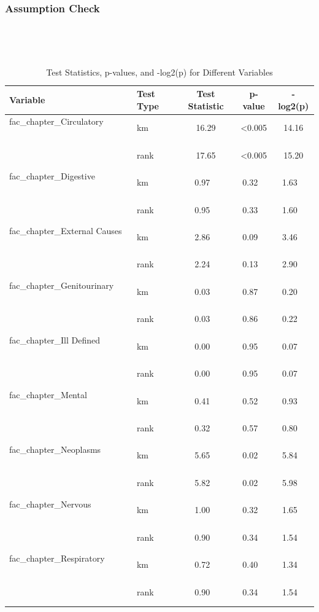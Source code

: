\subsubsection*{Assumption Check}
\begin{table}[H]
    \centering
    \caption{Test Statistics, p-values, and -log2(p) for Different Variables}
    \tiny
    \begin{tabular}{|l|l|c|c|c|}
\hline
\textbf{Variable}                & \textbf{Test Type} & \textbf{Test Statistic} & \textbf{p-value} & \textbf{-log2(p)} \\ \hline
 fac\_chapter\_Circulatory        & km   & 16.29 & <0.005 & 14.16 \\ \hline
                                    & rank & 17.65 & <0.005 & 15.20 \\ \hline
 fac\_chapter\_Digestive          & km   & 0.97  & 0.32   & 1.63  \\ \hline
                                    & rank & 0.95  & 0.33   & 1.60  \\ \hline
 fac\_chapter\_External Causes    & km   & 2.86  & 0.09   & 3.46  \\ \hline
                                    & rank & 2.24  & 0.13   & 2.90  \\ \hline
 fac\_chapter\_Genitourinary      & km   & 0.03  & 0.87   & 0.20  \\ \hline
                                    & rank & 0.03  & 0.86   & 0.22  \\ \hline
 fac\_chapter\_Ill Defined        & km   & 0.00  & 0.95   & 0.07  \\ \hline
                                    & rank & 0.00  & 0.95   & 0.07  \\ \hline
 fac\_chapter\_Mental             & km   & 0.41  & 0.52   & 0.93  \\ \hline
                                    & rank & 0.32  & 0.57   & 0.80  \\ \hline
 fac\_chapter\_Neoplasms          & km   & 5.65  & 0.02   & 5.84  \\ \hline
                                    & rank & 5.82  & 0.02   & 5.98  \\ \hline
 fac\_chapter\_Nervous            & km   & 1.00  & 0.32   & 1.65  \\ \hline
                                    & rank & 0.90  & 0.34   & 1.54  \\ \hline
 fac\_chapter\_Respiratory        & km   & 0.72  & 0.40   & 1.34  \\ \hline
                                    & rank & 0.90  & 0.34   & 1.54  \\ \hline

\end{tabular}
\end{table}
